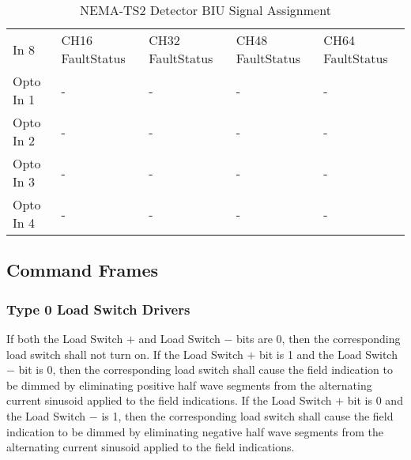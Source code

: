 \documentclass[]{article}
\begin{document}
\begin{table}[h]
{\begin{tabular}{lllll}
			In 8            & CH16 FaultStatus       & CH32 FaultStatus        & CH48 FaultStatus        & CH64 FaultStatus        \\
			Opto In 1       & -                      & -                       & -                       & -                       \\
			Opto In 2       & -                      & -                       & -                       & -                       \\
			Opto In 3       & -                      & -                       & -                       & -                       \\
			Opto In 4       & -                      & -                       & -                       & -                       \\ \hline
		\end{tabular}%
	}
	\caption{NEMA-TS2 Detector BIU Signal Assignment}
	\label{tab:dr-biu-signal-assignment}
\end{table}

\clearpage

\subsection {Command Frames}

\subsubsection {Type 0 Load Switch Drivers}

If both the Load Switch $+$ and Load Switch $-$ bits are 0, then the corresponding load switch shall not turn on.
If the Load Switch $+$ bit is 1 and the Load Switch $-$ bit is 0, then the corresponding load switch shall cause the field indication to be dimmed by eliminating positive half wave segments from the alternating current sinusoid applied to the field indications. If the Load Switch $+$ bit is 0 and the Load Switch $-$ is 1, then the corresponding load switch shall cause the field indication to be dimmed by eliminating negative half wave segments from the alternating current sinusoid applied to the field indications.
\end{document}
